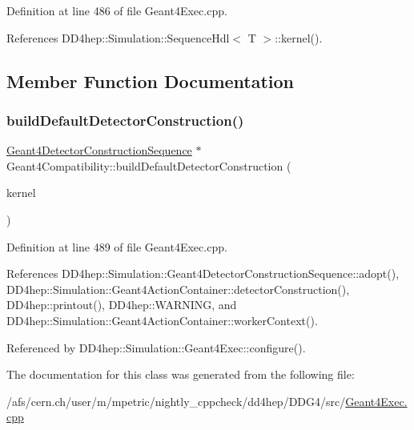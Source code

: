 Definition at line 486 of file Geant4\+Exec.\+cpp.



References D\+D4hep\+::\+Simulation\+::\+Sequence\+Hdl$<$ T $>$\+::kernel().



\subsection{Member Function Documentation}
\hypertarget{class_geant4_compatibility_abe1c52fe3962756ab59bc3cdde7edca2}{}\label{class_geant4_compatibility_abe1c52fe3962756ab59bc3cdde7edca2} 
\subsubsection{\texorpdfstring{build\+Default\+Detector\+Construction()}{buildDefaultDetectorConstruction()}}
{\footnotesize\ttfamily \hyperlink{class_d_d4hep_1_1_simulation_1_1_geant4_detector_construction_sequence}{Geant4\+Detector\+Construction\+Sequence} $\ast$ Geant4\+Compatibility\+::build\+Default\+Detector\+Construction (\begin{DoxyParamCaption}\item[{\hyperlink{class_d_d4hep_1_1_simulation_1_1_geant4_kernel}{Geant4\+Kernel} \&}]{kernel }\end{DoxyParamCaption})}



Definition at line 489 of file Geant4\+Exec.\+cpp.



References D\+D4hep\+::\+Simulation\+::\+Geant4\+Detector\+Construction\+Sequence\+::adopt(), D\+D4hep\+::\+Simulation\+::\+Geant4\+Action\+Container\+::detector\+Construction(), D\+D4hep\+::printout(), D\+D4hep\+::\+W\+A\+R\+N\+I\+NG, and D\+D4hep\+::\+Simulation\+::\+Geant4\+Action\+Container\+::worker\+Context().



Referenced by D\+D4hep\+::\+Simulation\+::\+Geant4\+Exec\+::configure().



The documentation for this class was generated from the following file\+:\begin{DoxyCompactItemize}
\item 
/afs/cern.\+ch/user/m/mpetric/nightly\+\_\+cppcheck/dd4hep/\+D\+D\+G4/src/\hyperlink{_geant4_exec_8cpp}{Geant4\+Exec.\+cpp}\end{DoxyCompactItemize}

